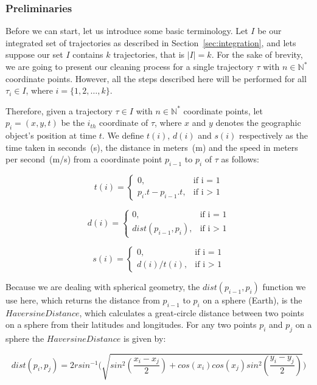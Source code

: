 \documentclass[a4paper,12pt]{article}
\begin{document}
\subsubsection{Preliminaries}\label{sec:preliminaries}
Before we can start, let us introduce some basic terminology. Let $I$ be our integrated set of trajectories as described in Section~\ref{sec:integration}, and lets suppose our set $I$ contains $k$ trajectories, that is $|I| = k$. For the sake of brevity, we are going to present our cleaning process for a single trajectory $\tau$ with $n\in\mathbb{N^*}$ coordinate points. However, all the steps described here will be performed for all $\tau_i \in I$, where $i = \{1, 2, \dots, k\}$.

Therefore, given a trajectory $\tau \in I$ with $n\in\mathbb{N^*}$ coordinate points, let $p_i = (x, y, t)$ be the $i_{th}$ coordinate of $\tau$, where $x$ and $y$ denotes the geographic object's position at time $t$. We define $t(i)$, $d(i)$ and $s(i)$ respectively as the time taken in seconds~(s), the distance in meters~(m) and the speed in meters per second~(m/s) from a coordinate point $p_{i-1}$ to $p_i$ of $\tau$ as follows:

	\[ t(i) = \left\{ \begin{array}{ll}
			0, & \mbox{if i = 1}\\
		    p_i.t - p_{i-1}.t, & \mbox{if i > 1}
	\end{array} \right. \]

	\[ d(i) = \left\{ \begin{array}{ll}
			0, & \mbox{if i = 1}\\
		    dist(p_{i-1}, p_i), & \mbox{if i > 1}
	\end{array} \right. \]
	
	\[ s(i) = \left\{ \begin{array}{ll}
			0, & \mbox{if i = 1}\\
		    d(i) / t(i), & \mbox{if i > 1}
	\end{array} \right. \]
	
Because we are dealing with spherical geometry, the $dist(p_{i-1}, p_i)$ function we use here, which returns the distance from $p_{i-1}$ to $p_i$ on a sphere (Earth), is the $Haversine Distance$, which calculates a great-circle distance between two points on a sphere from their  latitudes and longitudes. For any two points $p_i$ and $p_j$ on a sphere the $Haversine Distance$ is given by:

	\[
		{dist(p_i, p_j) = 2r sin^{-1}(\sqrt{sin^2(\frac{x_i - x_j}{2}) + cos(x_i)cos(x_j)sin^2(\frac{y_i - y_j}{2})}})
	\]
\end{document}
